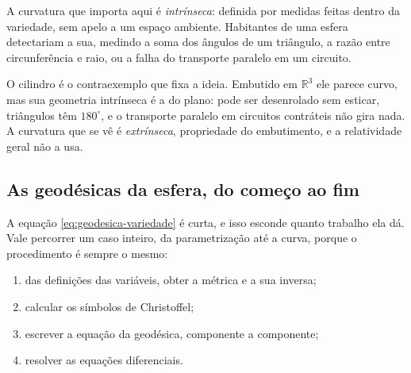 \documentclass[12pt,a4paper,oneside]{book}
\theoremstyle{rgplain}
\theoremstyle{rgremark}
\begin{document}
A curvatura que importa aqui é \emph{intrínseca}: definida por medidas feitas
dentro da variedade, sem apelo a um espaço ambiente. Habitantes de uma esfera
detectariam a sua, medindo a soma dos ângulos de um triângulo, a razão entre
circunferência e raio, ou a falha do transporte paralelo em um circuito.

\begin{atencao}
O cilindro é o contraexemplo que fixa a ideia. Embutido em $\mathbb{R}^3$ ele
parece curvo, mas sua geometria intrínseca é a do plano: pode ser
desenrolado sem esticar, triângulos têm $180^\circ$, e o transporte paralelo
em circuitos contráteis não gira nada. A curvatura que se vê é
\emph{extrínseca}, propriedade do embutimento, e a relatividade geral não a
usa.
\end{atencao}

\subsection*{As geodésicas da esfera, do começo ao fim}

A equação \eqref{eq:geodesica-variedade} é curta, e isso esconde quanto
trabalho ela dá. Vale percorrer um caso inteiro, da parametrização até a
curva, porque o procedimento é sempre o mesmo:
\begin{enumerate}
  \item das definições das variáveis, obter a métrica e a sua inversa;
  \item calcular os símbolos de Christoffel;
  \item escrever a equação da geodésica, componente a componente;
  \item resolver as equações diferenciais.
\end{enumerate}
\end{document}
